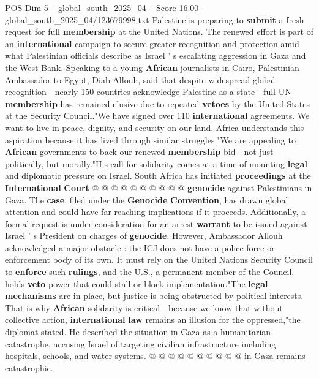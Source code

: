\begin{textsample}{POS Dim 5 – global\_south\_2025\_04 – Score 16.00 – global\_south\_2025\_04/123679998.txt}  \label{ex:f5_pos_067}
Palestine is preparing to \textbf{submit} a fresh request for full \textbf{membership} at the United Nations.
The renewed effort is part of an \textbf{international} campaign to secure greater recognition and protection amid what Palestinian officials describe as Israel ' s escalating aggression in Gaza and the West Bank.
Speaking to a young \textbf{African} journalists in Cairo, Palestinian Ambassador to Egypt, Diab Allouh, said that despite widespread global recognition - nearly 150 countries acknowledge Palestine as a state - full UN \textbf{membership} has remained elusive due to repeated \textbf{vetoes} by the United States at the Security Council."We have signed over 110 \textbf{international} agreements.
We want to live in peace, dignity, and security on our land.
Africa understands this aspiration because it has lived through similar struggles."We are appealing to \textbf{African} governments to back our renewed \textbf{membership} bid - not just politically, but morally."His call for solidarity comes at a time of mounting \textbf{legal} and diplomatic pressure on Israel.
South Africa has initiated \textbf{proceedings} at the \textbf{International} \textbf{Court} @ @ @ @ @ @ @ @ @ @ \textbf{genocide} against Palestinians in Gaza.
The \textbf{case}, filed under the \textbf{Genocide} \textbf{Convention}, has drawn global attention and could have far-reaching implications if it proceeds.
Additionally, a formal request is under consideration for an arrest \textbf{warrant} to be issued against Israel ' s President on charges of \textbf{genocide}.
However, Ambassador Allouh acknowledged a major obstacle : the ICJ does not have a police force or enforcement body of its own.
It must rely on the United Nations Security Council to \textbf{enforce} such \textbf{rulings}, and the U.S., a permanent member of the Council, holds \textbf{veto} power that could stall or block implementation."The \textbf{legal} \textbf{mechanisms} are in place, but justice is being obstructed by political interests.
That is why \textbf{African} solidarity is critical - because we know that without collective action, \textbf{international} \textbf{law} remains an illusion for the oppressed,"the diplomat stated.
He described the situation in Gaza as a humanitarian catastrophe, accusing Israel of targeting civilian infrastructure including hospitals, schools, and water systems. @ @ @ @ @ @ @ @ @ @ in Gaza remains catastrophic.

\end{textsample}

